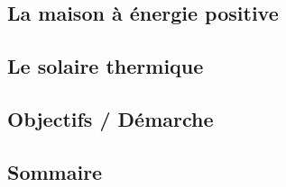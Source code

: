\documentclass[xcolor=x11names, compress, 10pt]{beamer}
\begin{document}
\subsection{La maison à énergie positive}
\begin{frame}[c]
    \vfill
    \vfill
\end{frame}



\subsection{Le solaire thermique}
\begin{frame}[c]
    \vfill
    \vfill
\end{frame}

\begin{frame}[c]
    \vfill
    \vfill
\end{frame}



\subsection{Objectifs / Démarche}
\begin{frame}[c]
    \vfill
    \vfill
\end{frame}



\subsection{Sommaire}
\begin{frame}
\tableofcontents[hideallsubsections]
\addtocounter{page}{-1}
\end{frame}


















\end{document}
